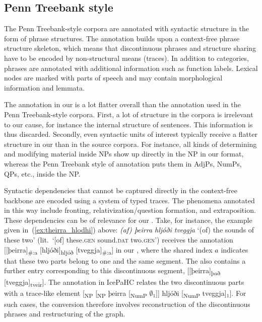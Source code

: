 \documentclass[output=paper,colorlinks,citecolor=brown]{langscibook}
\begin{document}
\subsection{Penn Treebank style}


The Penn Treebank-style corpora are annotated with syntactic structure in
the form of phrase structures. The annotation builds upon a
context-free phrase structure skeleton, which means that discontinuous
phrases and structure sharing have to be encoded by non-structural
means (traces). In addition to categories, phrases are
annotated with additional information such as function labels. Lexical
nodes are marked with parts of speech and may contain morphological
information and lemmata.

The annotation in our  is a lot flatter overall than the
annotation used in the Penn Treebank-style corpora. First, a lot of
structure in the corpora is irrelevant to our cause, for instance the internal
structure of sentences. This information is thus discarded. Secondly, even 
syntactic units of interest typically
receive a flatter structure in our  than in the source
corpora. For instance, all kinds of determining and modifying material
inside NPs show up directly in the NP in our format, whereas the
Penn Treebank style of annotation puts them in AdjPs, NumPs, QPs, etc.,
inside the NP.

Syntactic dependencies that cannot be captured directly in the
context-free backbone are encoded using a system of typed traces. The
phenomena annotated in this way include fronting,
relativization/question formation, and extraposition. These
dependencies can be of relevance for our . Take, for instance,
the example given in~(\ref{ex:theirra_hlodhi}) above: \textit{(af) þeirra hljóði tveggja}
`(of) the sounds of these two' (lit.~`[of] these.\textsc{gen}
sound.\textsc{dat} two.\textsc{gen}') receives the annotation
[[þeirra]\textsubscript{\#:a} [hljóði]\textsubscript{hljóð}
  [tveggja]\textsubscript{\#:a}] in our , where the shared index $a$
indicates that these two parts belong to one and the same segment. The  also contains a further entry corresponding to this discontinuous segment,
[[þeirra]\textsubscript{það} [tveggja]\textsubscript{tveir}]. The annotation in
IcePaHC relates the two discontinuous parts with a trace-like element
[\textsubscript{NP} [\textsubscript{NP} þeirra [\textsubscript{NumP} $\emptyset_1$]]
  hljóði [\textsubscript{NumP} tveggja]$_1$]. For such cases, the conversion
therefore involves reconstruction of the discontinuous phrases and
restructuring of the  graph. 
\end{document}
